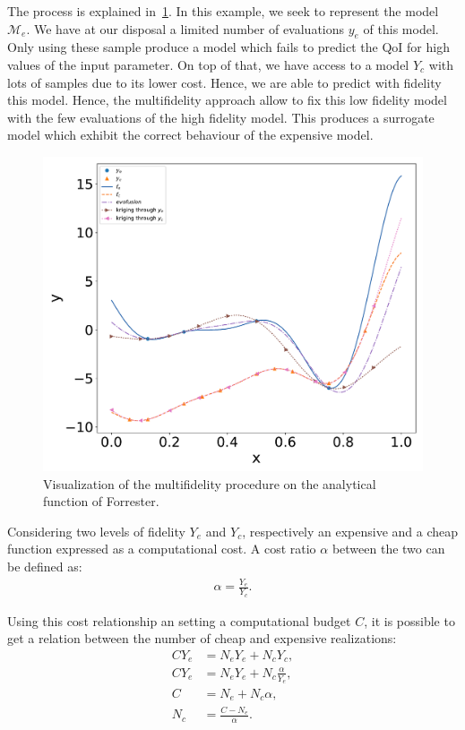 The process is explained in~\cref{fig:evofusion}. In this example, we seek to represent the model $\mathcal{M}_e$. We have at our disposal a limited number of evaluations $y_e$ of this model. Only using these sample produce a model which fails to predict the QoI for high values of the input parameter. On top of that, we have access to a model $Y_c$ with lots of samples due to its lower cost. Hence, we are able to predict with fidelity this model. Hence, the multifidelity approach allow to fix this low fidelity model with the few evaluations of the high fidelity model. This produces a surrogate model which exhibit the correct behaviour of the expensive model.

\begin{figure}[!ht]
\centering
\includegraphics[width=0.8\linewidth,keepaspectratio]{fig/literature/evofusion_forrester.pdf}
\caption{Visualization of the multifidelity procedure on the analytical function of Forrester.}
\label{fig:evofusion}
\end{figure}

Considering two levels of fidelity $Y_e$ and $Y_c$, respectively an expensive and a cheap function expressed as a computational cost. A cost ratio $\alpha$ between the two can be defined as:
\begin{align}
\alpha = \frac{Y_e}{Y_c}.
\end{align}

Using this cost relationship an setting a computational budget $C$, it is possible to get a relation between the number of cheap and expensive realizations:
\begin{align}
C Y_e &= N_e Y_e + N_c Y_c,\\
C Y_e &= N_e Y_e + N_c\frac{\alpha}{Y_e},\\
C &= N_e + N_c\alpha, \\
N_c &= \frac{C - N_e}{\alpha}.
\end{align}

